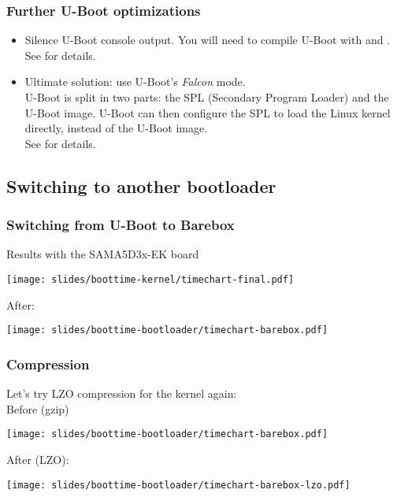 \begin{frame}
\frametitle{Further U-Boot optimizations}
\begin{itemize}
\item Silence U-Boot console output. You will need to compile
      U-Boot with  and
      .\\
      See  for details.
\item Ultimate solution: use U-Boot's {\em Falcon} mode.\\
      U-Boot is split in two parts: the SPL (Secondary Program Loader)
      and the U-Boot image. U-Boot can then configure the SPL to load
      the Linux kernel directly, instead of the U-Boot image.\\
      See  for details.
\end{itemize}
\end{frame}

\subsection{Switching to another bootloader}

\begin{frame}
\frametitle{Switching from U-Boot to Barebox}
Results with the SAMA5D3x-EK board \\
\begin{center}
    \texttt{[image: slides/boottime-kernel/timechart-final.pdf]}
\end{center}
After:
\begin{center}
    \texttt{[image: slides/boottime-bootloader/timechart-barebox.pdf]}
\end{center}
\end{frame}

\begin{frame}
\frametitle{Compression}
Let's try LZO compression for the kernel again:\\
Before (gzip)
\begin{center}
    \texttt{[image: slides/boottime-bootloader/timechart-barebox.pdf]}
\end{center}
After (LZO):
\begin{center}
    \texttt{[image: slides/boottime-bootloader/timechart-barebox-lzo.pdf]}
\end{center}
\end{frame}

